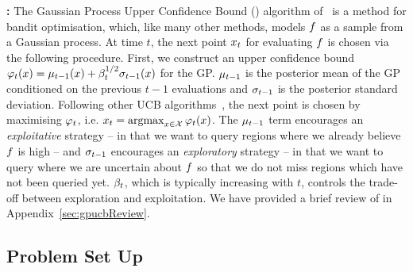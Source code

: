 \textbf{\gpucb:}
The Gaussian Process Upper Confidence Bound (\gpucb) algorithm
of~\citet{srinivas10gpbandits}  is a method for bandit optimisation,
which, like many other \bayos{} methods, models $f$ as a sample from a Gaussian process.
At time $t$, the next point $x_t$ for evaluating $f$ is chosen via the following
procedure.
First, we construct an upper confidence bound
$\varphi_t(x) = \mu_{t-1}(x) + \beta^{1/2}_t \sigma_{t-1}(x)$ for the GP. 
$\mu_{t-1}$ is the posterior mean of the GP conditioned on the previous $t-1$ evaluations
and $\sigma_{t-1}$ is the posterior standard deviation.
Following other UCB algorithms~\citep{auer03ucb},
the next point is chosen by maximising $\varphi_t$, i.e.
$x_t=\mathop{\mathrm{argmax}}_{x\in\mathcal{X}}\varphi_t(x)$.
The $\mu_{t-1}$ term encourages an \emph{exploitative} strategy -- in that we want to query
regions where we already believe  $f$ is high -- and $\sigma_{t-1}$ encourages
an \emph{exploratory} strategy -- in that we want to query where we are uncertain
about $f$ so that we do not miss regions which have not been queried yet.
$\beta_t$, which is typically increasing with $t$, controls the trade-off between
exploration and exploitation.
We have provided a brief review of \gpucbs in Appendix~\ref{sec:gpucbReview}.


\subsection{Problem Set Up}
\label{sec:prelims}


